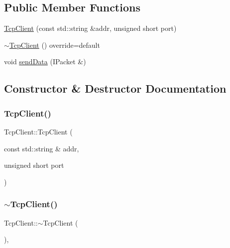 \subsection*{Public Member Functions}
\begin{DoxyCompactItemize}
\item 
\mbox{\hyperlink{classTcpClient_a5f9a9541eaab53c81a93fbaf5158e5df}{Tcp\+Client}} (const std\+::string \&addr, unsigned short port)
\item 
\mbox{\hyperlink{classTcpClient_a7e7d434aa7bc89f306de6d8bdf2510a0}{$\sim$\+Tcp\+Client}} () override=default
\item 
void \mbox{\hyperlink{classTcpClient_a7603c7361ee647a8e154844279f5d908}{send\+Data}} (I\+Packet \&)
\end{DoxyCompactItemize}


\subsection{Constructor \& Destructor Documentation}
\mbox{\label{classTcpClient_a5f9a9541eaab53c81a93fbaf5158e5df}} 
\subsubsection{\texorpdfstring{Tcp\+Client()}{TcpClient()}}
{\footnotesize\ttfamily Tcp\+Client\+::\+Tcp\+Client (\begin{DoxyParamCaption}\item[{const std\+::string \&}]{addr,  }\item[{unsigned short}]{port }\end{DoxyParamCaption})}

\mbox{\label{classTcpClient_a7e7d434aa7bc89f306de6d8bdf2510a0}} 
\subsubsection{\texorpdfstring{$\sim$\+Tcp\+Client()}{~TcpClient()}}
{\footnotesize\ttfamily Tcp\+Client\+::$\sim$\+Tcp\+Client (\begin{DoxyParamCaption}{ }\end{DoxyParamCaption})\hspace{0.3cm}{\ttfamily [override]}, {\ttfamily [default]}}



